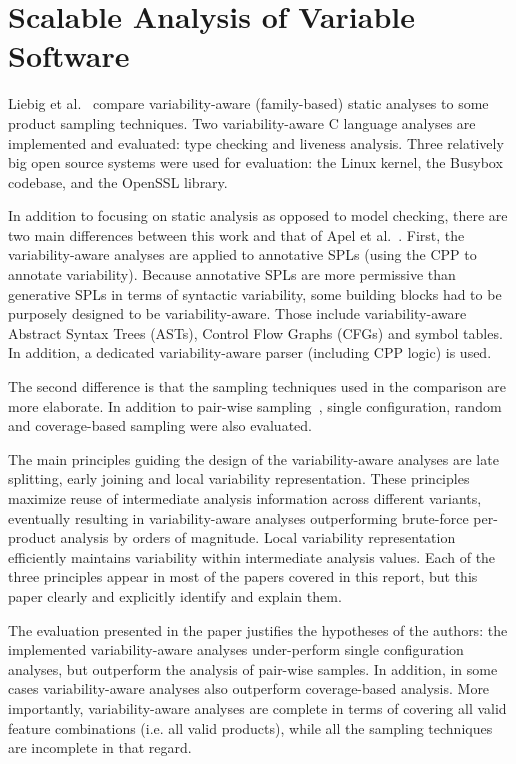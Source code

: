\documentclass[11pt]{article}
\begin{document}
\section{Scalable Analysis of Variable Software}
Liebig et al.~\cite{Liebig:2013} compare variability-aware (family-based) static analyses to some product sampling techniques. Two variability-aware C language analyses are implemented and evaluated: type checking and liveness analysis. Three relatively big open source systems were used for evaluation: the Linux kernel, the Busybox codebase, and the OpenSSL library.

In addition to focusing on static analysis as opposed to model checking, there are two main differences between this work and that of Apel et al.~\cite{Apel:2013}. First, the variability-aware analyses are applied to annotative SPLs (using the CPP to annotate variability). Because annotative SPLs are more permissive than generative SPLs in terms of syntactic variability, some building blocks had to be purposely designed to be variability-aware. Those include variability-aware Abstract Syntax Trees (ASTs), Control Flow Graphs (CFGs) and symbol tables. In addition, a dedicated variability-aware parser (including CPP logic) is used.

The second difference is that the sampling techniques used in the comparison are more elaborate. In addition to pair-wise sampling~\cite{Apel:2013}, single configuration, random and coverage-based sampling were also evaluated.

The main principles guiding the design of the variability-aware analyses are late splitting, early joining and local variability representation. These principles maximize reuse of intermediate analysis information across different variants, eventually resulting in variability-aware analyses outperforming brute-force per-product analysis by orders of magnitude. Local variability representation efficiently maintains variability within intermediate analysis values. Each of the three principles appear in most of the papers covered in this report, but this paper clearly and explicitly identify and explain them.

The evaluation presented in the paper justifies the hypotheses of the authors: the implemented variability-aware analyses under-perform single configuration analyses, but outperform the analysis of pair-wise samples. In addition, in some cases variability-aware analyses also outperform coverage-based analysis. More importantly, variability-aware analyses are complete in terms of covering all valid feature combinations (i.e. all valid products), while all the sampling techniques are incomplete in that regard.
\end{document}
